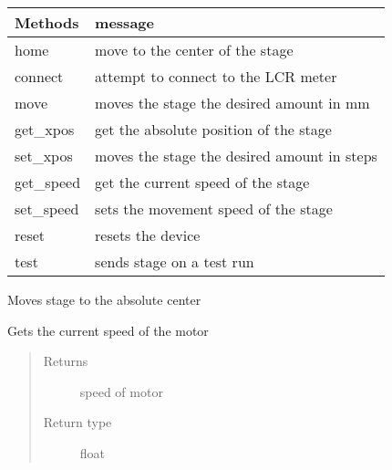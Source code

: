 \documentclass[letterpaper,10pt,english]{sphinxmanual}
\begin{document}
\begin{fulllineitems}
\begin{savenotes}\sphinxattablestart
\centering
\begin{tabulary}{\linewidth}[t]{|T|T|}
\hline
\sphinxstyletheadfamily 
Methods
&\sphinxstyletheadfamily 
message
\\
\hline
home
&
move to the center of the stage
\\
\hline
connect
&
attempt to connect to the LCR meter
\\
\hline
move
&
moves the stage the desired amount in mm
\\
\hline
get\_xpos
&
get the absolute position of the stage
\\
\hline
set\_xpos
&
moves the stage the desired amount in steps
\\
\hline
get\_speed
&
get the current speed of the stage
\\
\hline
set\_speed
&
sets the movement speed of the stage
\\
\hline
reset
&
resets the device
\\
\hline
test
&
sends stage on a test run
\\
\hline
\end{tabulary}
\par
\sphinxattableend\end{savenotes}

\begin{fulllineitems}
\label{\detokenize{source/laboratory.drivers:laboratory.drivers.motor.Motor.center}}
Moves stage to the absolute center

\end{fulllineitems}


\begin{fulllineitems}
\label{\detokenize{source/laboratory.drivers:laboratory.drivers.motor.Motor.get_speed}}
Gets the current speed of the motor
\begin{quote}\begin{description}
\item[{Returns}] \leavevmode
speed of motor

\item[{Return type}] \leavevmode
float


\end{description}
\end{quote}
\end{fulllineitems}
\end{fulllineitems}
\end{document}
